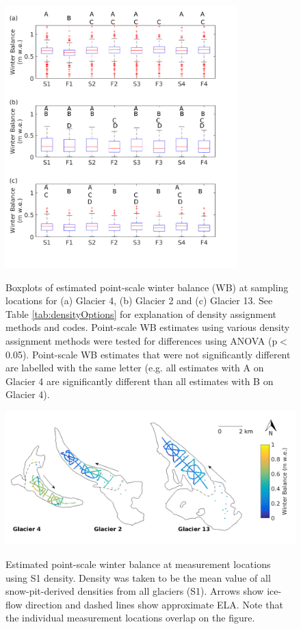 \documentclass{sfuthesis}
\begin{document}
\begin{figure}[H]
	\centering
	\includegraphics[width = 0.8\textwidth]{AllSWEopts_boxplot.png}\\
	\caption[Boxplots of estimated point-scale winter balance (WB) at sampling locations for study glaciers]{Boxplots of estimated point-scale winter balance (WB) at sampling locations for (a) Glacier 4, (b) Glacier 2 and (c) Glacier 13. See Table \ref{tab:densityOptions} for explanation of density assignment methods and codes. Point-scale WB estimates using various density assignment methods were tested for differences using ANOVA (p$<$0.05). Point-scale WB estimates that were not significantly different are labelled with the same letter (e.g. all estimates with A on Glacier 4 are significantly different than all estimates with B on Glacier 4).}
	\label{fig:AllSWEopts_boxplot}
\end{figure}


\begin{figure}[H]
	\centering
	\includegraphics[width = \textwidth]{SWEmap_opt2.png}\\
	\caption[Estimated point-scale winter balance at measurement locations using S1 density]{Estimated point-scale winter balance at measurement locations using S1 density. Density was taken to be the mean value of all snow-pit-derived densities from all glaciers (S1). Arrows show ice-flow direction and dashed lines show approximate ELA. Note that the individual measurement locations overlap on the figure.}
	\label{fig:SWEmap_S1}
\end{figure}
\end{document}
